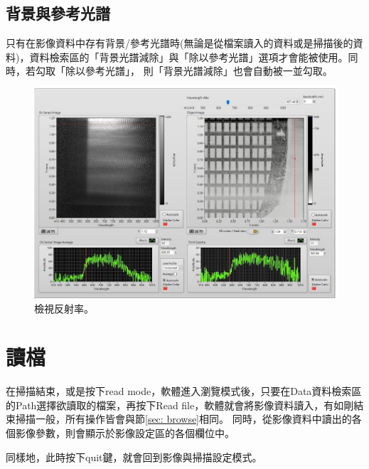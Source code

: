 \documentclass[12pt]{article}
\begin{document}
    \subsection{背景與參考光譜}\label{sec: bkg/ref}
    只有在影像資料中存有背景/參考光譜時(無論是從檔案讀入的資料或是掃描後的資料)，資料檢索區的「背景光譜減除」與「除以參考光譜」選項才會能被使用。同時，若勾取「除以參考光譜」，
    則「背景光譜減除」也會自動被一並勾取。
    \begin{figure}[h]
        \centering
        \includegraphics[width=0.75\linewidth]{reflection (2).jpeg}
        \caption{檢視反射率。}
        \label{fig: reflection}
    \end{figure}
    \section{讀檔}
    在掃描結束，或是按下read mode，軟體進入瀏覽模式後，只要在Data資料檢索區的Path選擇欲讀取的檔案，再按下Read file，軟體就會將影像資料讀入，有如剛結束掃描一般，所有操作皆會與節\ref{sec: browse}相同。
    同時，從影像資料中讀出的各個影像參數，則會顯示於影像設定區的各個欄位中。

    同樣地，此時按下quit鍵，就會回到影像與掃描設定模式。
\end{document}

